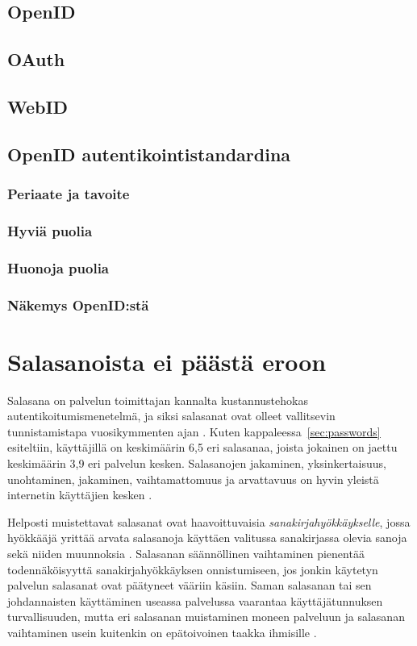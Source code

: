 \documentclass{tktltiki}
\begin{document}
\subsection{OpenID}
\subsection{OAuth}
\subsection{WebID}
\subsection{OpenID autentikointistandardina}
\subsubsection{Periaate ja tavoite}
\subsubsection{Hyviä puolia}
\subsubsection{Huonoja puolia}
\subsubsection{Näkemys OpenID:stä}

\section{Salasanoista ei päästä eroon}

Salasana on palvelun toimittajan kannalta kustannustehokas autentikoitumismenetelmä, ja siksi salasanat ovat olleet vallitsevin tunnistamistapa vuosikymmenten ajan \cite{pw_auth_system_perspective_08}. Kuten kappaleessa~\ref{sec:passwords} esiteltiin, käyttäjillä on keskimäärin 6,5 eri salasanaa, joista jokainen on jaettu keskimäärin 3,9 eri palvelun kesken. Salasanojen jakaminen, yksinkertaisuus, unohtaminen, jakaminen, vaihtamattomuus ja arvattavuus on hyvin yleistä internetin käyttäjien kesken \cite{study_of_passwords_07, pw_auth_system_perspective_08, passpet_06}.

Helposti muistettavat salasanat ovat haavoittuvaisia \emph{sanakirjahyökkäykselle}, jossa hyökkääjä yrittää arvata salasanoja käyttäen valitussa sanakirjassa olevia sanoja sekä niiden muunnoksia \cite{passpet_06}. Salasanan säännöllinen vaihtaminen pienentää todennäköisyyttä sanakirjahyökkäyksen onnistumiseen, jos jonkin käytetyn palvelun salasanat ovat päätyneet vääriin käsiin. Saman salasanan tai sen johdannaisten käyttäminen useassa palvelussa vaarantaa käyttäjätunnuksen turvallisuuden, mutta eri salasanan muistaminen moneen palveluun ja salasanan vaihtaminen usein kuitenkin on epätoivoinen taakka ihmisille \cite{passpet_06, pw_auth_system_perspective_08}.
\end{document}
